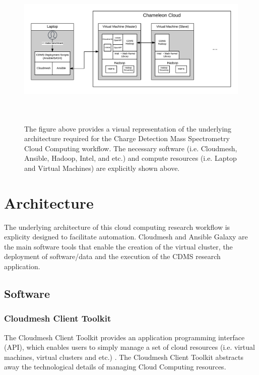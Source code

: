 \documentclass[9pt,twocolumn,twoside]{../../styles/osajnl}
\begin{document}
\begin{figure}[h]
\centering
\includegraphics[height=3.0in, width=\textwidth]{images/architecture}
\caption{The figure above provides a visual representation of the
  underlying architecture required for the Charge Detection Mass
  Spectrometry Cloud Computing workflow. The necessary software
  (i.e. Cloudmesh, Ansible, Hadoop, Intel, and etc.) and compute
  resources (i.e. Laptop and Virtual Machines) are explicitly shown
  above.}
\end{figure}

\section{Architecture} \label{architecture}
The underlying architecture of this cloud computing research workflow
is explicity designed to facilitate automation. Cloudmesh and Ansible
Galaxy are the main software tools that enable the creation of the
virtual cluster, the deployment of software/data and the execution of
the CDMS research application.

\subsection{Software} \label{software}
\subsubsection{Cloudmesh Client Toolkit} 
The Cloudmesh Client Toolkit provides an application programming
interface (API), which enables users to simply manage a set of cloud
resources (i.e. virtual machines, virtual clusters and etc.)
\cite{cloudmesh}. The Cloudmesh Client Toolkit abstracts away the
technological details of managing Cloud Computing resources.
\end{document}
